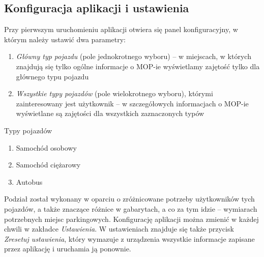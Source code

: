 \subsection{Konfiguracja aplikacji i ustawienia}
Przy pierwszym uruchomieniu aplikacji otwiera się panel konfiguracyjny, w którym należy ustawić dwa parametry:
\begin{enumerate}
\item \textit{Główny typ pojazdu} (pole jednokrotnego wyboru) -- w miejscach, w których znajdują się tylko ogólne informacje o MOP-ie wyświetlamy zajętość tylko dla głównego typu pojazdu
\item \textit{Wszystkie typy pojazdów} (pole wielokrotnego wyboru), którymi zainteresowany jest użytkownik -- w szczegółowych informacjach o MOP-ie wyświetlane są zajętości dla wszystkich zaznaczonych typów
\end{enumerate}
Typy pojazdów
\begin{enumerate}
\item Samochód osobowy
\item Samochód ciężarowy
\item Autobus
\end{enumerate}
Podział został wykonany w oparciu o zróżnicowane potrzeby użytkowników tych pojazdów, a także znaczące różnice w gabarytach, a co za tym idzie -- wymiarach potrzebnych miejsc parkingowych.
Konfigurację aplikacji można zmienić w każdej chwili w zakładce \emph{Ustawienia}.
W ustawieniach znajduje się także przycisk \textit{Zresetuj ustawienia}, który wymazuje z urządzenia wszystkie informacje zapisane przez aplikację i uruchamia ją ponownie. 

